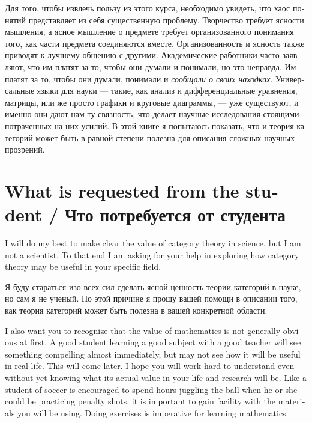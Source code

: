 \documentclass[a4paper]{book}
\theoremstyle{myth}
\begin{document}
\begin{english}
\begin{russian}Для того, чтобы извлечь пользу из этого курса, необходимо увидеть, что хаос понятий представляет из себя существенную проблему. Творчество требует ясности мышления, а ясное мышление о предмете требует организованного понимания того, как части предмета соединяются вместе. Организованность и ясность также приводят к лучшему общению с другими. Академические работники часто заявляют, что им платят за то, чтобы они думали и понимали, но это неправда. Им платят за то, чтобы они думали, понимали и {\em сообщали о своих находках}. Универсальные языки для науки — такие, как анализ и дифференциальные уравнения, матрицы, или же просто графики и круговые диаграммы, — уже существуют, и именно они дают нам ту связность, что делает научные исследования стоящими потраченных на них усилий. В этой книге я попытаюсь показать, что и теория категорий может быть в равной степени полезна для описания сложных научных прозрений. \end{russian}


\section{What is requested from the student / Что потребуется от студента}

I will do my best to make clear the value of category theory in science, but I am not a scientist. To that end I am asking for your help in exploring how category theory may be useful in your specific field.

\begin{russian}Я буду стараться изо всех сил сделать ясной ценность теории категорий в науке, но сам я не ученый. По этой причине я прошу вашей помощи в описании того, как теория категорий может быть полезна в вашей конкретной области. \end{russian}

I also want you to recognize that the value of mathematics is not generally obvious at first. A good student learning a good subject with a good teacher will see something compelling almost immediately, but may not see how it will be useful in real life. This will come later. I hope you will work hard to understand even without yet knowing what its actual value in your life and research will be. Like a student of soccer is encouraged to spend hours juggling the ball when he or she could be practicing penalty shots, it is important to gain facility with the materials you will be using. Doing exercises is imperative for learning mathematics.


\end{english}
\end{document}

